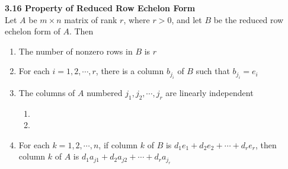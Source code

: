 \documentclass[11pt]{article}
\begin{document}
\begin{theorem*}
    \textbf{3.16 Property of Reduced Row Echelon Form} \\
    Let $A$ be $m\times n$ matrix of rank $r$, where $r>0$, and let $B$ be the reduced row echelon form of $A$. Then 
    \begin{enumerate}
        \item The number of nonzero rows in $B$ is $r$
        \item For each $i=1,2,\cdots, r$, there is a column $b_{j_i}$ of $B$ such that $b_{j_i} = e_i$
        \item The columns of $A$ numbered $j_1, j_2, \cdots, j_r$ are linearly independent
        \begin{enumerate}
            \item {}
            \item {}
        \end{enumerate}
        \item For each $k=1,2,\cdots, n$, if column $k$ of $B$ is $d_1e_1 + d_2e_2 + \cdots + d_re_r$, then column $k$ of $A$ is $d_1a_{j1} + d_2a_{j2} + \cdots + d_r a_{j_r}$
    \end{enumerate}
\end{theorem*}
\end{document}
